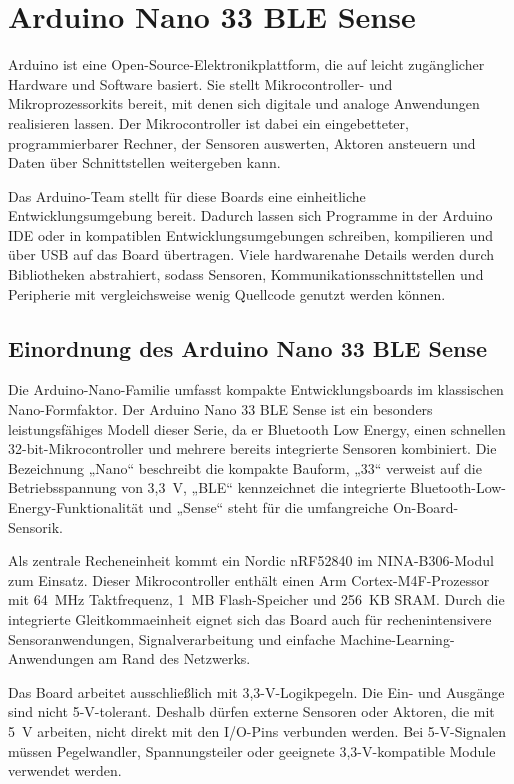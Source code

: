 %
%

\chapter{Arduino Nano 33 BLE Sense}

Arduino ist eine Open-Source-Elektronikplattform, die auf leicht zugänglicher Hardware und Software basiert. Sie stellt Mikrocontroller- und Mikroprozessorkits bereit, mit denen sich digitale und analoge Anwendungen realisieren lassen. Der Mikrocontroller ist dabei ein eingebetteter, programmierbarer Rechner, der Sensoren auswerten, Aktoren ansteuern und Daten über Schnittstellen weitergeben kann.

Das Arduino-Team stellt für diese Boards eine einheitliche Entwicklungsumgebung bereit. Dadurch lassen sich Programme in der Arduino IDE oder in kompatiblen Entwicklungsumgebungen schreiben, kompilieren und über USB auf das Board übertragen. Viele hardwarenahe Details werden durch Bibliotheken abstrahiert, sodass Sensoren, Kommunikationsschnittstellen und Peripherie mit vergleichsweise wenig Quellcode genutzt werden können.

\section{Einordnung des Arduino Nano 33 BLE Sense}

Die Arduino-Nano-Familie umfasst kompakte Entwicklungsboards im klassischen Nano-Formfaktor. Der Arduino Nano 33 BLE Sense ist ein besonders leistungsfähiges Modell dieser Serie, da er Bluetooth Low Energy, einen schnellen 32-bit-Mikrocontroller und mehrere bereits integrierte Sensoren kombiniert. Die Bezeichnung „Nano“ beschreibt die kompakte Bauform, „33“ verweist auf die Betriebsspannung von 3,3~V, „BLE“ kennzeichnet die integrierte Bluetooth-Low-Energy-Funktionalität und „Sense“ steht für die umfangreiche On-Board-Sensorik.

Als zentrale Recheneinheit kommt ein Nordic nRF52840 im NINA-B306-Modul zum Einsatz. Dieser Mikrocontroller enthält einen Arm Cortex-M4F-Prozessor mit 64~MHz Taktfrequenz, 1~MB Flash-Speicher und 256~KB SRAM. Durch die integrierte Gleitkommaeinheit eignet sich das Board auch für rechenintensivere Sensoranwendungen, Signalverarbeitung und einfache Machine-Learning-Anwendungen am Rand des Netzwerks.

Das Board arbeitet ausschließlich mit 3,3-V-Logikpegeln. Die Ein- und Ausgänge sind nicht 5-V-tolerant. Deshalb dürfen externe Sensoren oder Aktoren, die mit 5~V arbeiten, nicht direkt mit den I/O-Pins verbunden werden. Bei 5-V-Signalen müssen Pegelwandler, Spannungsteiler oder geeignete 3,3-V-kompatible Module verwendet werden.

